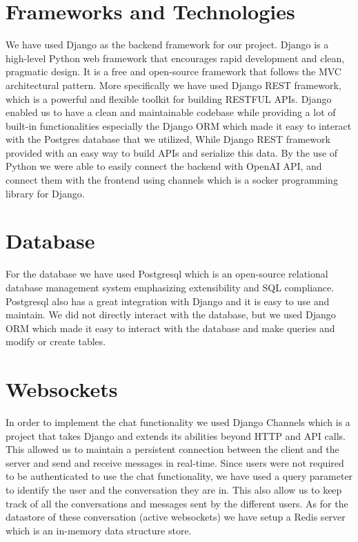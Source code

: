 \section{Frameworks and Technologies}
We have used Django as the backend framework for our project.
Django is a high-level Python web framework that encourages rapid development and clean, pragmatic design.
It is a free and open-source framework that follows the MVC architectural pattern.
More specifically we have used Django REST framework, which is a powerful and flexible toolkit for building RESTFUL APIs.
Django enabled us to have a clean and maintainable codebase while providing a lot of built-in functionalities especially the Django ORM which made it easy to interact with the Postgres database that we utilized,
While Django REST framework provided with an easy way to build APIs and serialize this data.
By the use of Python we were able to easily connect the backend with OpenAI API, and connect them with the frontend using channels which is a socker programming library for Django.

\section{Database}
For the database we have used Postgresql which is an open-source relational database management system emphasizing extensibility and SQL compliance.
Postgresql also has a great integration with Django and it is easy to use and maintain.
We did not directly interact with the database, but we used Django ORM which made it easy to interact with the database and make queries and modify or create tables.

\section{Websockets}
In order to implement the chat functionality we used Django Channels which is a project that takes Django and extends its abilities beyond HTTP and API calls.
This allowed us to maintain a persistent connection between the client and the server and send and receive messages in real-time.
Since users were not required to be authenticated to use the chat functionality, we have used a query parameter to identify the user and the conversation they are in.
This also allow us to keep track of all the conversations and messages sent by the different users.
As for the datastore of these conversation (active websockets) we have setup a Redis server which is an in-memory data structure store.

